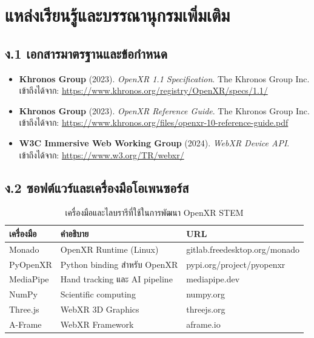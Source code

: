 \chapter{แหล่งเรียนรู้และบรรณานุกรมเพิ่มเติม}
\label{app:D}

\section*{ง.1 เอกสารมาตรฐานและข้อกำหนด}

\begin{itemize}
    \item \textbf{Khronos Group} (2023). \textit{OpenXR 1.1 Specification}. The Khronos Group Inc. \\
          เข้าถึงได้จาก: \url{https://www.khronos.org/registry/OpenXR/specs/1.1/}
    \item \textbf{Khronos Group} (2023). \textit{OpenXR Reference Guide}. The Khronos Group Inc. \\
          เข้าถึงได้จาก: \url{https://www.khronos.org/files/openxr-10-reference-guide.pdf}
    \item \textbf{W3C Immersive Web Working Group} (2024). \textit{WebXR Device API}. \\
          เข้าถึงได้จาก: \url{https://www.w3.org/TR/webxr/}
\end{itemize}

\section*{ง.2 ซอฟต์แวร์และเครื่องมือโอเพนซอร์ส}

\begin{table}[H]
\centering
\caption{เครื่องมือและไลบรารีที่ใช้ในการพัฒนา OpenXR STEM}
\begin{tabularx}{\textwidth}{lYY}
\toprule
\textbf{เครื่องมือ} & \textbf{คำอธิบาย} & \textbf{URL} \\
\midrule
Monado & OpenXR Runtime (Linux) & gitlab.freedesktop.org/monado \\
PyOpenXR & Python binding สำหรับ OpenXR & pypi.org/project/pyopenxr \\
MediaPipe & Hand tracking และ AI pipeline & mediapipe.dev \\
NumPy & Scientific computing & numpy.org \\
Three.js & WebXR 3D Graphics & threejs.org \\
A-Frame & WebXR Framework & aframe.io \\
\bottomrule
\end{tabularx}
\end{table}

